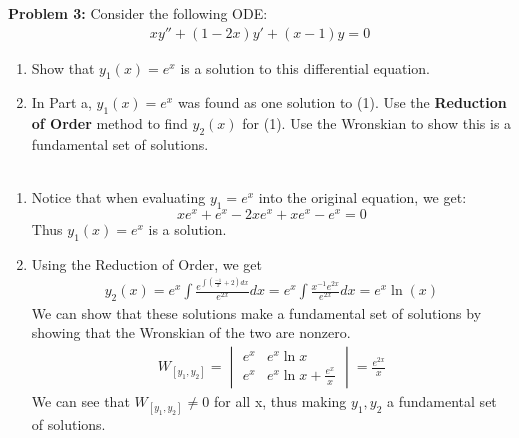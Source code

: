 \documentclass[12pt]{article}
\begin{document}
\noindent \textbf{Problem 3: }Consider the following ODE:
	\begin{align}
	xy'' + (1 - 2x)y' + (x-1)y = 0
	\end{align}
	\begin{enumerate}[label = (\alph*)]
		\item Show that $y_1(x) = e^x$ is a solution to this differential equation. 
		\item In Part a, $y_1(x) = e^x$ was found as one solution to (1). Use the \textbf{Reduction of Order} method to find $y_2(x)$ for (1). Use the Wronskian to show this is a fundamental set of solutions. \\ \\
	\end{enumerate}
	\begin{enumerate}[label = (\alph*)]
		\item Notice that when evaluating $y_1 = e^x$ into the original equation, we get:
		$$
		xe^x + e^x - 2xe^x + xe^x - e^x = 0
		$$
		Thus $y_1(x) = e^x$ is a solution.
		\item Using the Reduction of Order, we get 
		\begin{align*}
			y_2(x) = e^x \int \frac{e^{\int \left(\frac{-1}{x} + 2\right) dx}}{e^{2x}}dx = e^x \int \frac{x^{-1}e^{2x}}{e^{2x}}dx = e^x\ln(x)
		\end{align*}
		We can show that these solutions make a fundamental set of solutions by showing that the Wronskian of the two are nonzero.
		\begin{align*}
			W_{[y_1, y_2]} = 
			\begin{vmatrix}
				e^x & e^x\ln x \\
				e^x & e^x\ln x + \frac{e^x}{x}
			\end{vmatrix} = 
			\frac{e^{2x}}{x}
		\end{align*}
		We can see that $W_{[y_1,y_2]} \not = 0$ for all x, thus making $y_1, y_2$ a fundamental set of solutions.
	\end{enumerate}
\end{document}
